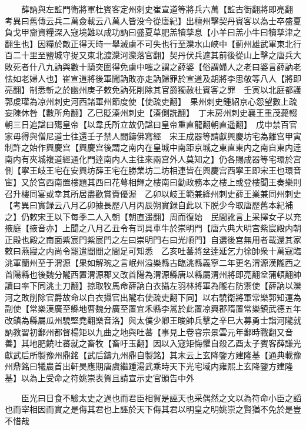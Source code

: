 　　薛訥與左監門衛將軍杜賓客定州刺史崔宣道等將兵六萬【監古衘翻將即亮翻　考異曰舊傳云兵二萬僉載云八萬人皆没今從唐紀】出檀州擊契丹賓客以為士卒盛夏負戈甲齎資糧深入寇境難以成功訥曰盛夏草肥羔犢孳息【小羊曰羔小牛曰犢孳津之翻生也】因糧於敵正得天時一舉滅虜不可失也行至灤水山峽中【薊州雄武軍東北行百二十里至鹽城守捉又東北渡灤河灤落官翻】契丹伏兵遮其前後從山上擊之唐兵大敗死者什八九訥與數十騎突圍得免虜中嗤之謂之薛婆【俗謂婦人之老曰婆言薛訥老怯如老婦人也】崔宣道將後軍聞訥敗亦走訥歸罪於宣道及胡將李思敬等八人【將即亮翻】制悉斬之於幽州庚子敕免訥死削除其官爵獨赦杜賓客之罪　壬寅以北庭都護郭䖍瓘為凉州刺史河西諸軍州節度使【使疏吏翻】　果州刺史鍾紹京心怨望數上疏妄陳休咎【數所角翻】乙巳貶溱州刺史【溱側詵翻】　丁未房州刺史襄王重茂薨輟朝三日追諡曰殤皇帝【以韋氏所立故仍諡曰皇帝重直龍翻朝直遥翻】　戊申禁百官家毋得與僧尼道士往還壬子禁人間鑄佛寫經　宋王成器等請獻興慶坊宅為離宫甲寅制許之始作興慶宫【興慶宫後謂之南内在皇城中南距京城之東直東内之南自東内逹南内有夾城複道經通化門逹南内人主往來兩宫外人莫知之】仍各賜成器等宅環於宫側【寧王岐王宅在安興坊薛王宅在勝業坊二坊相連皆在興慶宫西寧王即宋王也環音宦】又於宫西南置樓題其西曰花萼相輝之樓南曰勤政務本之樓上或登樓聞王奏樂則召升樓同宴或幸其所居盡歡賞賚優渥　乙卯以岐王範兼絳州刺史薛王業兼同州刺史　【考異曰實録云八月乙卯據長歷八月丙辰朔實録自此以下脱少今取唐歷舊本紀補之】仍敕宋王以下每季二人入朝【朝直遥翻】周而復始　民間訛言上采擇女子以充掖庭【掖音亦】上聞之八月乙丑令有司具車牛於崇明門【唐六典大明宫紫宸殿内朝正殿也殿之南面紫宸門紫宸門之左曰崇明門右曰光順門】自選後宫無用者載還其家敕曰燕寢之内尚令罷遣閭閻之間足可知悉　乙亥吐蕃將坌逹延乞力徐帥衆十萬寇臨洮軍蘭州至于渭源【果如解琬之言岷州溢樂縣古臨洮縣義寧二年更名渭源漢隴西之首陽縣也後魏分隴西置渭源郡又改首陽為渭源縣唐以縣屬渭州將即亮翻坌蒲頓翻帥讀曰率下同洮土刀翻】掠取牧馬命薛訥白衣攝左羽林將軍為隴右防禦使【薛訥以灤河之敗削除官爵故命以白衣攝官出隴右使疏吏翻下同】以右驍衛將軍常樂郭知運為副使【常樂漢廣至縣地曹魏分廣至置宜禾縣李暠於此置凉興郡隋置常樂鎮武德五年改鎮為縣屬瓜州驍堅堯翻樂音洛】與太僕少卿王晙帥兵擊之辛巳大募勇士詣河隴就訥教習初鄯州都督楊矩以九曲之地與吐蕃【事見上卷睿宗景雲元年鄯時戰翻又音善】其地肥饒吐蕃就之畜牧【畜吁玉翻】因以入寇矩悔懼自殺乙酉太子賓客薛謙光獻武后所製豫州鼎銘【武后鑄九州鼎自製銘】其末云上玄降鑒方建隆基【通典載豫州鼎銘曰犧農首出軒昊應期唐虞繼踵湯武乘時天下光宅域内雍熙上玄降鑒方建隆基】以為上受命之符姚崇表賀且請宣示史官頒告中外

　　臣光曰日食不驗太史之過也而君臣相賀是誣天也采偶然之文以為符命小臣之謟也而宰相因而實之是侮其君也上誣於天下侮其君以明皇之明姚崇之賢猶不免於是豈不惜哉

